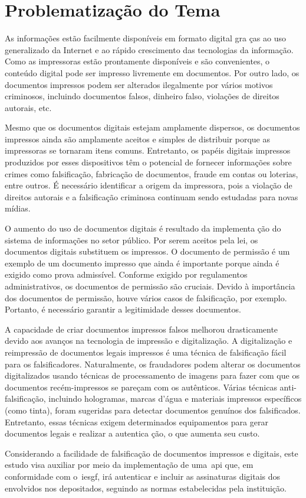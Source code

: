 \section{Problematização do Tema}

As informações estão facilmente disponíveis em formato digital gra
ças ao uso generalizado da Internet e ao rápido crescimento das
tecnologias da informação.
Como as impressoras estão prontamente disponíveis e são
convenientes, o conteúdo digital pode ser
impresso livremente em documentos.
Por outro lado, os documentos impressos podem ser alterados
ilegalmente por vários motivos criminosos, incluindo documentos
falsos, dinheiro falso, violações
de direitos autorais, etc\cite{tsai2019}.

Mesmo que os documentos digitais estejam amplamente dispersos, os
documentos impressos ainda são amplamente aceitos e simples de
distribuir porque as impressoras se tornaram itens comuns.
Entretanto, os papéis digitais impressos produzidos por esses
dispositivos têm o potencial de fornecer informações sobre crimes
como falsificação, fabricação de documentos, fraude em contas ou
loterias, entre outros.
É necessário identificar a origem da impressora, pois a violação de
direitos autorais e a falsificação criminosa continuam sendo
estudadas para novas mídias\cite{tsai2019}.

O aumento do uso de documentos digitais é resultado da implementa
ção do sistema de informações no setor público.
Por serem aceitos pela lei, os documentos digitais substituem os
impressos.
O documento de permissão é um exemplo de um documento impresso que
ainda é importante porque ainda é exigido como prova admissível.
Conforme exigido por regulamentos administrativos, os documentos de
permissão são cruciais.
Devido à importância dos documentos de permissão, houve vários
casos de falsificação, por exemplo.
Portanto, é necessário garantir a legitimidade desses documentos\cite{
    arief2019}.

A capacidade de criar documentos impressos falsos melhorou
drasticamente devido aos avanços na tecnologia de impressão e
digitalização.
A digitalização e reimpressão de documentos legais impressos é uma
técnica de falsificação fácil para os falsificadores.
Naturalmente, os fraudadores podem alterar os documentos
digitalizados usando técnicas de processamento de imagens para
fazer com que os documentos recém-impressos se pareçam
com os autênticos.
Várias técnicas anti-falsificação, incluindo hologramas, marcas
d'água e materiais impressos específicos (como tinta), foram
sugeridas para detectar documentos genuínos dos falsificados.
Entretanto, essas técnicas exigem determinados equipamentos para
gerar documentos legais e realizar a autentica ção, o que aumenta
seu custo\cite{zhang2019}.

Considerando a facilidade de falsificação de documentos impressos e digitais,
este estudo visa auxiliar por meio da implementação de uma~\acrshort{api} que,
em conformidade com o~\acrlong{iesgf}, irá autenticar e incluir as assinaturas
digitais dos envolvidos nos  depositados, seguindo as normas
estabelecidas pela instituição.